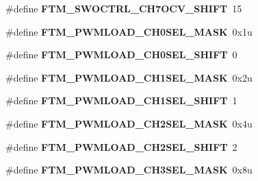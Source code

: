 \begin{DoxyCompactItemize}
\item 
\hypertarget{group___f_t_m___register___masks_ga6319ffea29243485dcc140b0ef64002c}{}\#define {\bfseries F\+T\+M\+\_\+\+S\+W\+O\+C\+T\+R\+L\+\_\+\+C\+H7\+O\+C\+V\+\_\+\+S\+H\+I\+F\+T}~15\label{group___f_t_m___register___masks_ga6319ffea29243485dcc140b0ef64002c}

\item 
\hypertarget{group___f_t_m___register___masks_ga3aed163f12371474717169636b2d9620}{}\#define {\bfseries F\+T\+M\+\_\+\+P\+W\+M\+L\+O\+A\+D\+\_\+\+C\+H0\+S\+E\+L\+\_\+\+M\+A\+S\+K}~0x1u\label{group___f_t_m___register___masks_ga3aed163f12371474717169636b2d9620}

\item 
\hypertarget{group___f_t_m___register___masks_ga02d773d77ba9c505275e876cd180cd79}{}\#define {\bfseries F\+T\+M\+\_\+\+P\+W\+M\+L\+O\+A\+D\+\_\+\+C\+H0\+S\+E\+L\+\_\+\+S\+H\+I\+F\+T}~0\label{group___f_t_m___register___masks_ga02d773d77ba9c505275e876cd180cd79}

\item 
\hypertarget{group___f_t_m___register___masks_ga01a9bbb1d2eca61c95255992a5a13e19}{}\#define {\bfseries F\+T\+M\+\_\+\+P\+W\+M\+L\+O\+A\+D\+\_\+\+C\+H1\+S\+E\+L\+\_\+\+M\+A\+S\+K}~0x2u\label{group___f_t_m___register___masks_ga01a9bbb1d2eca61c95255992a5a13e19}

\item 
\hypertarget{group___f_t_m___register___masks_gae4943b2c121fcb66763b08960f09bff4}{}\#define {\bfseries F\+T\+M\+\_\+\+P\+W\+M\+L\+O\+A\+D\+\_\+\+C\+H1\+S\+E\+L\+\_\+\+S\+H\+I\+F\+T}~1\label{group___f_t_m___register___masks_gae4943b2c121fcb66763b08960f09bff4}

\item 
\hypertarget{group___f_t_m___register___masks_gabd7f8ac1fa597d6b97b85926ae9e6fec}{}\#define {\bfseries F\+T\+M\+\_\+\+P\+W\+M\+L\+O\+A\+D\+\_\+\+C\+H2\+S\+E\+L\+\_\+\+M\+A\+S\+K}~0x4u\label{group___f_t_m___register___masks_gabd7f8ac1fa597d6b97b85926ae9e6fec}

\item 
\hypertarget{group___f_t_m___register___masks_ga477fae93760ebabafd41a6be108c41a1}{}\#define {\bfseries F\+T\+M\+\_\+\+P\+W\+M\+L\+O\+A\+D\+\_\+\+C\+H2\+S\+E\+L\+\_\+\+S\+H\+I\+F\+T}~2\label{group___f_t_m___register___masks_ga477fae93760ebabafd41a6be108c41a1}

\item 
\hypertarget{group___f_t_m___register___masks_gacbe9716a0b6c45b6e509f4060145ecc0}{}\#define {\bfseries F\+T\+M\+\_\+\+P\+W\+M\+L\+O\+A\+D\+\_\+\+C\+H3\+S\+E\+L\+\_\+\+M\+A\+S\+K}~0x8u\label{group___f_t_m___register___masks_gacbe9716a0b6c45b6e509f4060145ecc0}


\end{DoxyCompactItemize}
